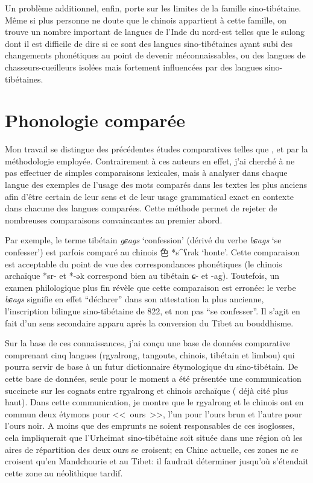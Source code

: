 \documentclass[oldfontcommands,oneside,a4paper,11pt]{memoir}
\newcommand{\zh}[1]{{\cn #1}}
\begin{document}
Un problème additionnel, enfin, porte sur les limites de la famille sino-tibétaine. Même si plus personne ne doute que le chinois appartient à cette famille, on trouve un nombre important de langues de l'Inde du nord-est telles que le sulong dont il est difficile de dire si ce sont des langues sino-tibétaines ayant subi des changements phonétiques au point de devenir méconnaissables, ou des langues de chasseurs-cueilleurs isolées mais fortement influencées par des langues sino-tibétaines. 


\section{Phonologie comparée}
Mon travail se distingue des précédentes études comparatives telles que \citet{peiros96st}, \citet{gong95st} et \citet{matisoff03} par la méthodologie employée. Contrairement à ces auteurs en effet, j’ai cherché à ne pas  effectuer de simples comparaisons lexicales, mais à analyser dans chaque langue des exemples de l'usage des mots comparés dans les textes les plus anciens afin d’être certain de leur sens et de leur usage grammatical exact en contexte dans chacune des langues comparées. Cette méthode permet de rejeter de nombreuses comparaisons convaincantes au premier abord. 


Par exemple, le terme tibétain \textit{gɕags} ‘confession’ (dérivé du verbe \textit{bɕags} ‘se confesser’) est parfois comparé au chinois \zh{色} *s^{ʕ}rək ‘honte’. Cette comparaison est acceptable du point de vue des correspondances phonétiques (le chinois archaïque *sr- et *-ək correspond bien au tibétain ɕ- et -ag). Toutefois, un examen philologique plus fin révèle que cette comparaison est erronée: le verbe  \textit{bɕags} signifie en effet ``déclarer'' dans son attestation la plus ancienne, l’inscription bilingue sino-tibétaine de 822, et non pas ``se confesser''. Il s’agit en fait d’un sens secondaire apparu après la conversion du Tibet au bouddhisme.


Sur la base de ces connaissances, j’ai conçu une base de données comparative comprenant cinq langues (rgyalrong, tangoute, chinois, tibétain et limbou) qui pourra servir de base à un futur dictionnaire étymologique du sino-tibétain. De cette base de données, seule pour le moment a été présentée une communication succincte sur les cognats entre rgyalrong et chinois archaïque (\citealt{jacques05} déjà cité plus haut). Dans cette communication, je montre que le rgyalrong et le chinois ont en commun deux étymons pour <<~ours~>>, l'un pour l'ours brun et l'autre pour l'ours noir. A moins que des emprunts ne soient responsables de ces isoglosses, cela impliquerait que l'Urheimat sino-tibétaine soit située dans une région où les aires de répartition des deux ours se croisent; en Chine actuelle, ces zones ne se croisent qu'en Mandchourie et au Tibet: il faudrait déterminer jusqu'où s'étendait cette zone au néolithique tardif.
\end{document}
